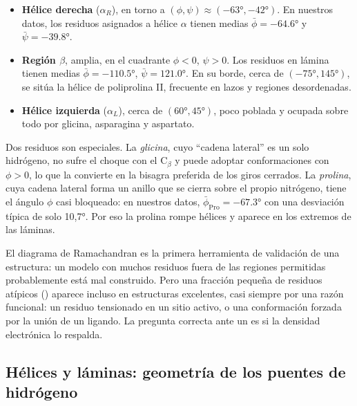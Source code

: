 \begin{itemize}
  \item \textbf{Hélice derecha} ($\alpha_R$), en torno a $(\phi,\psi)\approx(-\ang{63},-\ang{42})$. En nuestros datos, los residuos asignados a hélice $\alpha$ tienen medias $\bar\phi=-\ang{64,6}$ y $\bar\psi=-\ang{39,8}$.
  \item \textbf{Región $\beta$}, amplia, en el cuadrante $\phi<0$, $\psi>0$. Los residuos en lámina tienen medias $\bar\phi=-\ang{110,5}$, $\bar\psi=\ang{121,0}$. En su borde, cerca de $(-\ang{75},\ang{145})$, se sitúa la hélice de poliprolina II, frecuente en lazos y regiones desordenadas.
  \item \textbf{Hélice izquierda} ($\alpha_L$), cerca de $(\ang{60},\ang{45})$, poco poblada y ocupada sobre todo por glicina, asparagina y aspartato.
\end{itemize}

Dos residuos son especiales. La \emph{glicina}, cuyo ``cadena lateral'' es un solo hidrógeno, no sufre el choque con el C$_\beta$ y puede adoptar conformaciones con $\phi>0$, lo que la convierte en la bisagra preferida de los giros cerrados. La \emph{prolina}, cuya cadena lateral forma un anillo que se cierra sobre el propio nitrógeno, tiene el ángulo $\phi$ casi bloqueado: en nuestros datos, $\bar\phi_{\mathrm{Pro}}=-\ang{67,3}$ con una desviación típica de solo \ang{10,7}. Por eso la prolina rompe hélices y aparece en los extremos de las láminas.

\begin{cuidado}
El diagrama de Ramachandran es la primera herramienta de validación de una estructura: un modelo con muchos residuos fuera de las regiones permitidas probablemente está mal construido. Pero una fracción pequeña de residuos atípicos () aparece incluso en estructuras excelentes, casi siempre por una razón funcional: un residuo tensionado en un sitio activo, o una conformación forzada por la unión de un ligando. La pregunta correcta ante un  es si la densidad electrónica lo respalda.
\end{cuidado}

\subsection{Hélices y láminas: geometría de los puentes de hidrógeno}

